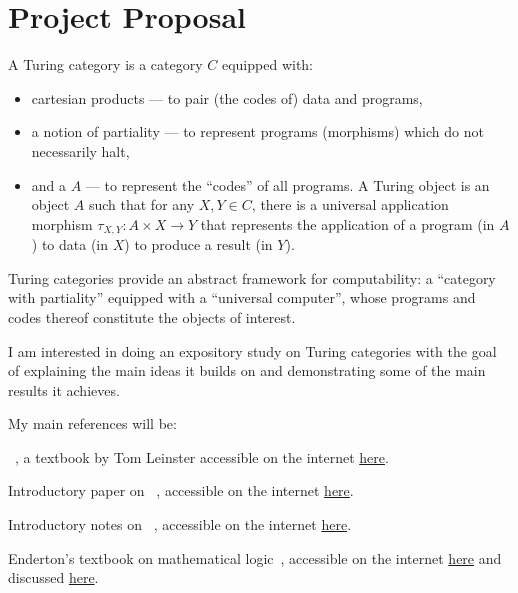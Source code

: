 {}%
\section*{Project Proposal}

A Turing category is a category $C$ equipped with:
\begin{itemize}
  \item cartesian products --- to pair (the codes of) data and programs,
  \item a notion of partiality --- to represent programs (morphisms)
    which do not necessarily halt,
  \item and a  $A$ --– to represent the
    ``codes'' of all programs.
    A Turing object is an object $A$ such that for any $X, Y \in C$,
    there is a universal application morphism
    $\tau_{X, Y} : A \times X \to Y$
    that represents the application of a program (in $A$) to data (in $X$)
    to produce a result (in $Y$).~\cite{TURING-CATEGORIES}
\end{itemize}

Turing categories provide an abstract framework for computability:
a ``category with partiality'' equipped with a ``universal computer'',
whose programs and codes thereof constitute the objects of interest.
\cite{TURING-CATEGORIES}

I am interested in doing an expository study on
Turing categories with the goal of explaining
the main ideas it builds on
and demonstrating some of the main
results it achieves.

My main references will be:

\begin{enumarabic}
  \item {}~\cite{CATEGORY-THEORY-TEXT},
    a textbook by Tom Leinster accessible on the internet
    \href{https://arxiv.org/abs/1612.09375}{here}.
  \item Introductory paper on 
    ~\cite{TURING-CATEGORIES},
    accessible on the internet \href{https://doi.org/10.1016/j.apal.2008.04.005}{here}.
  \item Introductory notes on
    ~\cite{APPLICATIVE-STRUCTURES},
    accessible on the internet
    \href{https://link.springer.com/chapter/10.1007/3-540-60164-3_21#citeas}{here}.
  \item Enderton's textbook on mathematical logic~\cite{ENDERTON},
    accessible on the internet \href{https://doi.org/10.1007/978-3-319-20451-2}{here}
    and discussed \href{https://www.logicmatters.net/tyl/booknotes/enderton/}{here}.
\end{enumarabic}

